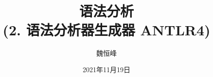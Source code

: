 \documentclass[]{beamer}
\title[语法分析]{语法分析 \\ (2. 语法分析器生成器 ANTLR4)}
\author[魏恒峰]{\large 魏恒峰}
\institute{hfwei@nju.edu.cn}
\date{2021年11月19日}
\begin{document}
\maketitle



\thankyou{}

\end{document}
